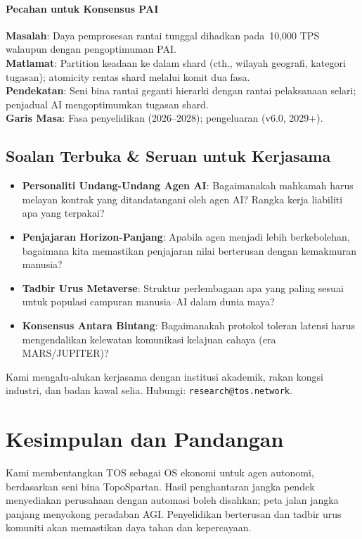 \documentclass[11pt]{article}
\begin{document}
\paragraph{Pecahan untuk Konsensus PAI}
\textbf{Masalah}: Daya pemprosesan rantai tunggal dihadkan pada~10,000 TPS walaupun dengan pengoptimuman PAI.\\
\textbf{Matlamat}: Partition keadaan ke dalam shard (cth., wilayah geografi, kategori tugasan); atomicity rentas shard melalui komit dua fasa.\\
\textbf{Pendekatan}: Seni bina rantai geganti hierarki dengan rantai pelaksanaan selari; penjadual AI mengoptimumkan tugasan shard.\\
\textbf{Garis Masa}: Fasa penyelidikan (2026--2028); pengeluaran (v6.0, 2029+).

\subsection{Soalan Terbuka \& Seruan untuk Kerjasama}

\begin{itemize}[noitemsep]
  \item \textbf{Personaliti Undang-Undang Agen AI}: Bagaimanakah mahkamah harus melayan kontrak yang ditandatangani oleh agen AI? Rangka kerja liabiliti apa yang terpakai?
  \item \textbf{Penjajaran Horizon-Panjang}: Apabila agen menjadi lebih berkebolehan, bagaimana kita memastikan penjajaran nilai berterusan dengan kemakmuran manusia?
  \item \textbf{Tadbir Urus Metaverse}: Struktur perlembagaan apa yang paling sesuai untuk populasi campuran manusia--AI dalam dunia maya?
  \item \textbf{Konsensus Antara Bintang}: Bagaimanakah protokol toleran latensi harus mengendalikan kelewatan komunikasi kelajuan cahaya (era MARS/JUPITER)?
\end{itemize}

Kami mengalu-alukan kerjasama dengan institusi akademik, rakan kongsi industri, dan badan kawal selia. Hubungi: \texttt{research@tos.network}.

\section{Kesimpulan dan Pandangan}
Kami membentangkan TOS sebagai OS ekonomi untuk agen autonomi, berdasarkan seni bina TopoSpartan. Hasil penghantaran jangka pendek menyediakan perusahaan dengan automasi boleh disahkan; peta jalan jangka panjang menyokong peradaban AGI. Penyelidikan berterusan dan tadbir urus komuniti akan memastikan daya tahan dan kepercayaan.
\end{document}
